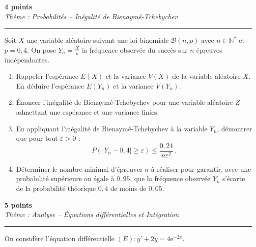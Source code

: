 \documentclass[12pt,a4paper]{article}
\newcommand{\exercice}[3][5]{%
    \noindent{\Large\textbf{Exercice #2}} \hfill \textbf{#1 points}\\[0.20cm]%
    {\normalsize\textit{#3}}%
    \par\vspace{0.28cm}\hrule\vspace{0.55cm}%
}
\begin{document}
\newpage

\exercice[4]{1}{Thème : Probabilités -- Inégalité de Bienaymé-Tchebychev}

Soit $X$ une variable aléatoire suivant une loi binomiale $\mathcal{B}(n, p)$ avec $n \in \mathbb{N}^*$ et $p = 0,4$. On pose $Y_n = \frac{X}{n}$ la fréquence observée du succès sur $n$ épreuves indépendantes.

\vspace{0.45cm}

\begin{enumerate}
    \item Rappeler l'espérance $E(X)$ et la variance $V(X)$ de la variable aléatoire $X$. En déduire l'espérance $E(Y_n)$ et la variance $V(Y_n)$.
    
    \vspace{0.75cm}
    \item Énoncer l'inégalité de Bienaymé-Tchebychev pour une variable aléatoire $Z$ admettant une espérance et une variance finies.
    
    \vspace{0.75cm}
    \item En appliquant l'inégalité de Bienaymé-Tchebychev à la variable $Y_n$, démontrer que pour tout $\varepsilon > 0$ :
    \[
        P\left(\left|Y_n - 0,4\right| \geq \varepsilon\right) \leq \frac{0,24}{n \varepsilon^2}\,.
    \]
    
    \vspace{0.75cm}
    \item Déterminer le nombre minimal d'épreuves $n$ à réaliser pour garantir, avec une probabilité supérieure ou égale à $0,95$, que la fréquence observée $Y_n$ s'écarte de la probabilité théorique $0,4$ de moins de $0,05$.
\end{enumerate}

\newpage

\exercice[5]{2}{Thème : Analyse -- Équations différentielles et Intégration}

On considère l'équation différentielle $(E) : y' + 2y = 4\mathrm{e}^{-2x}$.

\vspace{0.45cm}
\end{document}
